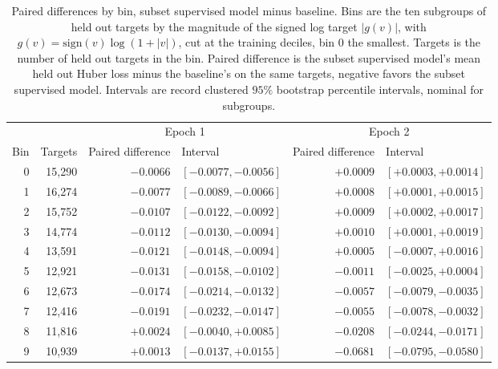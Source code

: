 \begin{table}[!htbp]
\caption{Paired differences by bin, subset supervised model minus baseline. Bins are the ten subgroups of held out targets by the magnitude of the signed log target $|g(v)|$, with $g(v) = \mathrm{sign}(v) \log(1 + |v|)$, cut at the training deciles, bin 0 the smallest. Targets is the number of held out targets in the bin. Paired difference is the subset supervised model's mean held out Huber loss minus the baseline's on the same targets, negative favors the subset supervised model. Intervals are record clustered $95\%$ bootstrap percentile intervals, nominal for subgroups.}
\label{tab:pilot_bins_sampled}
\small
\begin{tabular}{rrrlrl}
\toprule
 & & \multicolumn{2}{c}{Epoch 1} & \multicolumn{2}{c}{Epoch 2} \\
\cmidrule(lr){3-4} \cmidrule(lr){5-6}
Bin & Targets & Paired difference & Interval & Paired difference & Interval \\
\midrule
0 & 15,290 & $-0.0066$ & $[-0.0077, -0.0056]$ & $+0.0009$ & $[+0.0003, +0.0014]$ \\
1 & 16,274 & $-0.0077$ & $[-0.0089, -0.0066]$ & $+0.0008$ & $[+0.0001, +0.0015]$ \\
2 & 15,752 & $-0.0107$ & $[-0.0122, -0.0092]$ & $+0.0009$ & $[+0.0002, +0.0017]$ \\
3 & 14,774 & $-0.0112$ & $[-0.0130, -0.0094]$ & $+0.0010$ & $[+0.0001, +0.0019]$ \\
4 & 13,591 & $-0.0121$ & $[-0.0148, -0.0094]$ & $+0.0005$ & $[-0.0007, +0.0016]$ \\
5 & 12,921 & $-0.0131$ & $[-0.0158, -0.0102]$ & $-0.0011$ & $[-0.0025, +0.0004]$ \\
6 & 12,673 & $-0.0174$ & $[-0.0214, -0.0132]$ & $-0.0057$ & $[-0.0079, -0.0035]$ \\
7 & 12,416 & $-0.0191$ & $[-0.0232, -0.0147]$ & $-0.0055$ & $[-0.0078, -0.0032]$ \\
8 & 11,816 & $+0.0024$ & $[-0.0040, +0.0085]$ & $-0.0208$ & $[-0.0244, -0.0171]$ \\
9 & 10,939 & $+0.0013$ & $[-0.0137, +0.0155]$ & $-0.0681$ & $[-0.0795, -0.0580]$ \\
\bottomrule
\end{tabular}
\end{table}